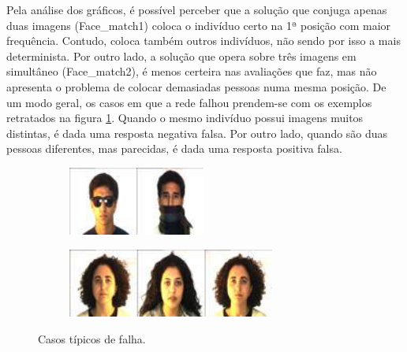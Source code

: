 \newline
\noindent
\noindent Pela análise dos gráficos, é possível perceber que a solução que conjuga apenas duas imagens (Face\_match1) coloca o indivíduo certo na 1ª posição com maior frequência. Contudo, coloca também outros indivíduos, não sendo por isso a mais determinista.\newline
\noindent Por outro lado, a solução que opera sobre três imagens em simultâneo (Face\_match2), é menos certeira nas avaliações que faz, mas não apresenta o problema de colocar demasiadas pessoas numa mesma posição. \newline
\noindent De um modo geral, os casos em que a rede falhou prendem-se com os exemplos retratados na figura \ref{fig:falhas}. Quando o mesmo indivíduo possui imagens muitos distintas, é dada uma resposta negativa falsa. Por outro lado, quando são duas pessoas diferentes, mas parecidas, é dada uma resposta positiva falsa.

\begin{figure}[h]
  \centering
  \begin{subfigure}{4.5cm}
    \centering\includegraphics[width=4.5cm]{ar_falha1.jpg}
    \caption{}
  \end{subfigure}
  \hspace{1em}
  \begin{subfigure}{6.8cm}
    \centering\includegraphics[width=6.8cm]{ar_falha2.jpg}
    \caption{}
  \end{subfigure}
  \caption{Casos típicos de falha.}
  \label{fig:falhas}
\end{figure}